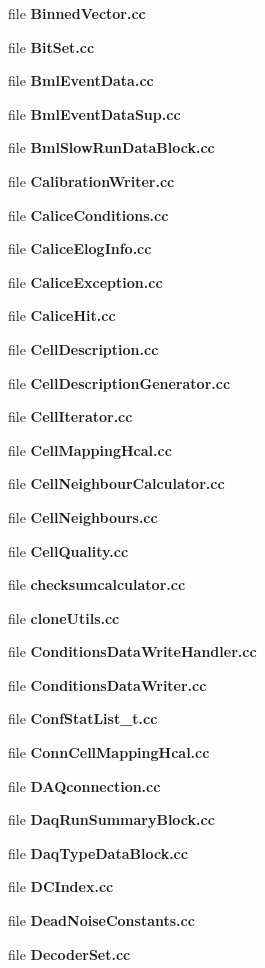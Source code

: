 \begin{DoxyCompactItemize}
\item 
file {\bfseries Binned\-Vector.\-cc}
\item 
file {\bfseries Bit\-Set.\-cc}
\item 
file {\bfseries Bml\-Event\-Data.\-cc}
\item 
file {\bfseries Bml\-Event\-Data\-Sup.\-cc}
\item 
file {\bfseries Bml\-Slow\-Run\-Data\-Block.\-cc}
\item 
file {\bfseries Calibration\-Writer.\-cc}
\item 
file {\bfseries Calice\-Conditions.\-cc}
\item 
file {\bfseries Calice\-Elog\-Info.\-cc}
\item 
file {\bfseries Calice\-Exception.\-cc}
\item 
file {\bfseries Calice\-Hit.\-cc}
\item 
file {\bfseries Cell\-Description.\-cc}
\item 
file {\bfseries Cell\-Description\-Generator.\-cc}
\item 
file {\bfseries Cell\-Iterator.\-cc}
\item 
file {\bfseries Cell\-Mapping\-Hcal.\-cc}
\item 
file {\bfseries Cell\-Neighbour\-Calculator.\-cc}
\item 
file {\bfseries Cell\-Neighbours.\-cc}
\item 
file {\bfseries Cell\-Quality.\-cc}
\item 
file {\bfseries checksumcalculator.\-cc}
\item 
file {\bfseries clone\-Utils.\-cc}
\item 
file {\bfseries Conditions\-Data\-Write\-Handler.\-cc}
\item 
file {\bfseries Conditions\-Data\-Writer.\-cc}
\item 
file {\bfseries Conf\-Stat\-List\-\_\-t.\-cc}
\item 
file {\bfseries Conn\-Cell\-Mapping\-Hcal.\-cc}
\item 
file {\bfseries D\-A\-Qconnection.\-cc}
\item 
file {\bfseries Daq\-Run\-Summary\-Block.\-cc}
\item 
file {\bfseries Daq\-Type\-Data\-Block.\-cc}
\item 
file {\bfseries D\-C\-Index.\-cc}
\item 
file {\bfseries Dead\-Noise\-Constants.\-cc}
\item 
file {\bfseries Decoder\-Set.\-cc}
\item 

\end{DoxyCompactItemize}
